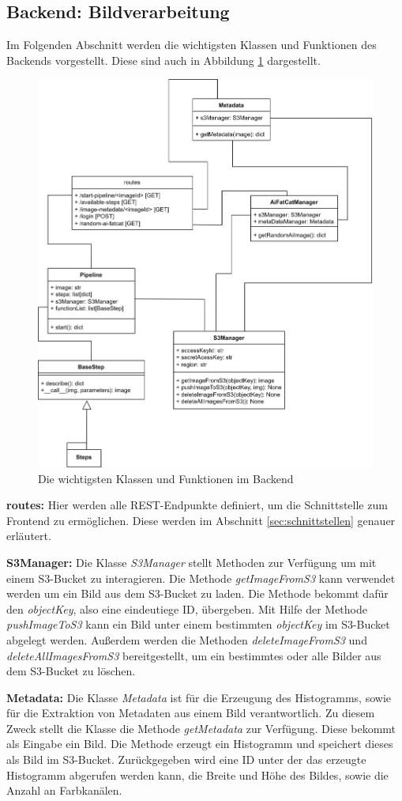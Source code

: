 \subsection{Backend: Bildverarbeitung}
Im Folgenden Abschnitt werden die wichtigsten Klassen und Funktionen des Backends vorgestellt. Diese sind auch in Abbildung \ref{fig:backend} dargestellt.
\FloatBarrier
\begin{figure}
    \centering
    \includegraphics[width=.7\textwidth]{Bilder/BackendBDCC.png}
    \caption{Die wichtigsten Klassen und Funktionen im Backend}
    \label{fig:backend}
\end{figure}
\textbf{routes:} Hier werden alle REST-Endpunkte definiert, um die Schnittstelle zum Frontend zu ermöglichen. Diese werden im Abschnitt \ref{sec:schnittstellen} genauer erläutert. 

\textbf{S3Manager:} Die Klasse \textit{S3Manager} stellt Methoden zur Verfügung um mit einem S3-Bucket zu interagieren. Die Methode \textit{getImageFromS3} kann verwendet werden um ein Bild aus dem S3-Bucket zu laden. Die Methode bekommt dafür den \textit{objectKey}, also eine eindeutiege ID, übergeben. Mit Hilfe der Methode \textit{pushImageToS3} kann ein Bild unter einem bestimmten \textit{objectKey} im S3-Bucket abgelegt werden. Außerdem werden die Methoden \textit{deleteImageFromS3} und \textit{deleteAllImagesFromS3} bereitgestellt, um ein bestimmtes oder alle Bilder aus dem S3-Bucket zu löschen. 

\textbf{Metadata:} 
Die Klasse \textit{Metadata} ist für die Erzeugung des Histogramms, sowie für die Extraktion von Metadaten aus einem Bild verantwortlich. 
Zu diesem Zweck stellt die Klasse die Methode \textit{getMetadata} zur Verfügung. 
Diese bekommt als Eingabe ein Bild. Die Methode erzeugt ein Histogramm und speichert dieses als Bild im S3-Bucket. Zurückgegeben wird eine ID unter der das erzeugte Histogramm abgerufen werden kann, die Breite und Höhe des Bildes, sowie die Anzahl an Farbkanälen. 

